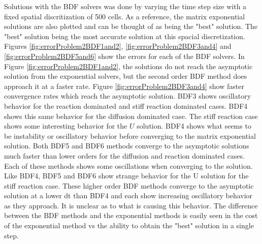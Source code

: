 Solutions with the BDF solvers was done by varying the time step size with a fixed spatial discritization of 500 cells. As a reference, the matrix exponential solutions are also plotted and can be thought of as being the "best" solution. The "best" solution being the most accurate solution at this spacial discretization. Figures \ref{fig:errorProblem2BDF1and2}, \ref{fig:errorProblem2BDF3and4} and \ref{fig:errorProblem2BDF5and6} show the errors for each of the BDF solvers. In Figure \ref{fig:errorProblem2BDF1and2}, the solutions do not reach the asymptotic solution from the exponential solvers, but the second order BDF method does approach it at a faster rate. Figure \ref{fig:errorProblem2BDF3and4} show faster convergence rates which reach the asymptotic solution. BDF3 shows oscillatory behavior for the reaction dominated and stiff reaction dominated cases. BDF4 shows this same behavior for the diffusion dominated case. The stiff reaction case shows some interesting behavior for the $U$ solution. BDF4 shows what seems to be instability or oscillatory behavior before converging to the matrix exponential solution. Both BDF5 and BDF6 methods converge to the asymptotic solutions much faster than lower orders for the diffusion and reaction dominated cases. Each of these methods shows some oscillations when converging to the solution. Like BDF4, BDF5 and BDF6 show strange behavior for the U solution for the stiff reaction case. These higher order BDF methods converge to the asymptotic solution at a lower dt than BDF4 and each show increasing oscillatory behavior as they approach. It is unclear as to what is causing this behavior. The difference between the BDF methods and the exponential methods is easily seen in the cost of the exponential method vs the ability to obtain the "best" solution in a single step. 

\FloatBarrier

